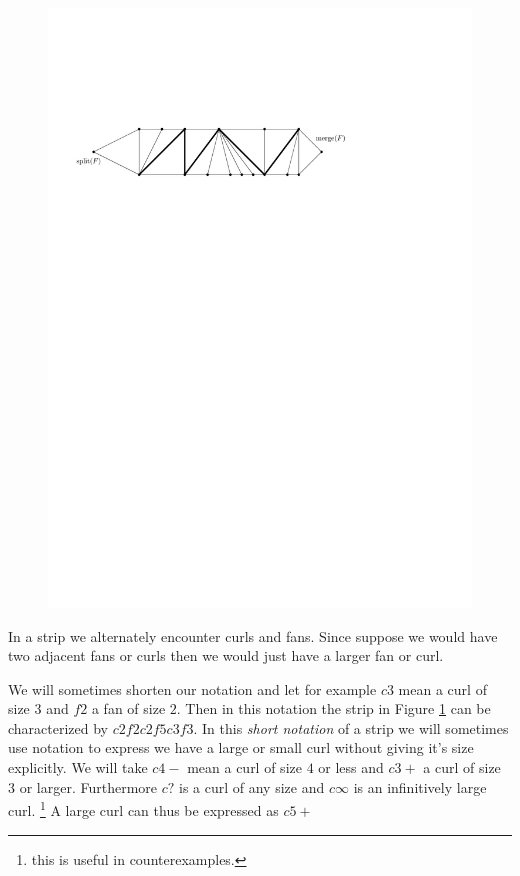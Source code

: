  \begin{figure}[h]
   \centering
   \includegraphics[scale=.9]{unifiedAlgo/img/fansandcurls}
   \caption{}
   \label{fig:uni:fansandcurls}
 \end{figure}


In a strip we alternately encounter curls and fans. Since suppose we would have two adjacent fans or curls then we would just have a larger fan or curl.

We will sometimes shorten our notation and let for example $c3$ mean a curl of size $3$ and $f2$ a fan of size $2$. Then in this notation the strip in Figure \ref{fig:uni:fansandcurls} can be characterized by $c2 f2 c2 f5 c3 f3$. In this \emph{short notation} of a strip we will sometimes use notation to express we have a large  or small curl without giving it's size explicitly. We will take $c4-$ mean a curl of size $4$ or less and $c3+$ a curl of size $3$ or larger.  Furthermore $c?$ is a curl of any size and $c\infty$ is an infinitively large curl.
\footnote{this is useful in counterexamples.} A large curl can thus be expressed as $c5+$

